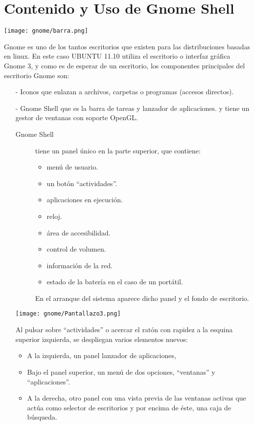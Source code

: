 \chapter{Contenido y Uso de Gnome Shell}
\begin{center}
\texttt{[image: gnome/barra.png]}
\end{center}
Gnome es uno de los tantos escritorios que existen para las distribuciones basadas en linux.
En este caso UBUNTU 11.10 utiliza el escritorio o interfaz gráfica Gnome 3, y como es de esperar de un escritorio, los componentes principales del escritorio Gnome son:
\begin{itemize}
\item[-] Iconos que enlazan a archivos, carpetas o programas (accesos directos).
\item[-] Gnome Shell que es la barra de tareas y lanzador de aplicaciones. y tiene un gestor de ventanas con soporte OpenGL.
\begin{description}
\item[Gnome Shell] tiene un panel único en la parte superior, que contiene:
\begin{itemize}
 \item menú de usuario. 
 \item un botón “actividades”. 
 \item aplicaciones en ejecución.
 \item reloj.
 \item área de accesibilidad.
 \item control de volumen.
 \item información de la red.
 \item estado de la batería en el caso de un portátil.
\end{itemize}
En el arranque del sistema aparece dicho panel y el fondo de escritorio.
\end{description}
\begin{center}
\texttt{[image: gnome/Pantallazo3.png]}
\end{center}
Al pulsar sobre “actividades” o acercar el ratón con rapidez a la esquina superior izquierda, se despliegan varios elementos nuevos:
\begin{itemize}
\item A la izquierda, un panel lanzador de aplicaciones,
\item Bajo el panel superior, un menú de dos opciones, “ventanas” y “aplicaciones”.
\item A la derecha, otro panel con una vista previa de las ventanas activas que actúa como selector de escritorios y por encima de éste, una caja de búsqueda.

\end{itemize}
\end{itemize}
